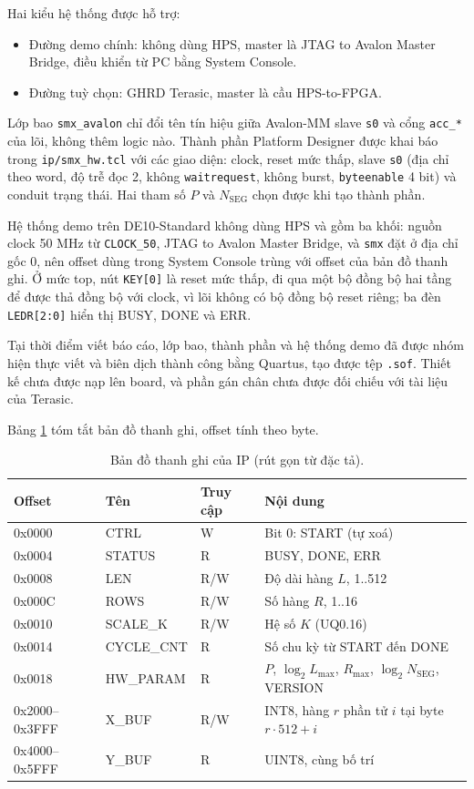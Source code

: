 Hai kiểu hệ thống được hỗ trợ:
\begin{itemize}
  \item Đường demo chính: không dùng HPS, master là JTAG to Avalon Master Bridge, điều khiển từ PC bằng System Console.
  \item Đường tuỳ chọn: GHRD Terasic, master là cầu HPS-to-FPGA.
\end{itemize}

Lớp bao \texttt{smx\_avalon} chỉ đổi tên tín hiệu giữa Avalon-MM slave \texttt{s0} và cổng \texttt{acc\_*} của lõi, không thêm logic nào. Thành phần Platform Designer được khai báo trong \texttt{ip/smx\_hw.tcl} với các giao diện: clock, reset mức thấp, slave \texttt{s0} (địa chỉ theo word, độ trễ đọc 2, không \texttt{waitrequest}, không burst, \texttt{byteenable} 4 bit) và conduit trạng thái. Hai tham số $P$ và $N_{\text{SEG}}$ chọn được khi tạo thành phần.

Hệ thống demo trên DE10-Standard không dùng HPS và gồm ba khối: nguồn clock 50 MHz từ \texttt{CLOCK\_50}, JTAG to Avalon Master Bridge, và \texttt{smx} đặt ở địa chỉ gốc 0, nên offset dùng trong System Console trùng với offset của bản đồ thanh ghi. Ở mức top, nút \texttt{KEY[0]} là reset mức thấp, đi qua một bộ đồng bộ hai tầng để được thả đồng bộ với clock, vì lõi không có bộ đồng bộ reset riêng; ba đèn \texttt{LEDR[2:0]} hiển thị BUSY, DONE và ERR.

Tại thời điểm viết báo cáo, lớp bao, thành phần và hệ thống demo đã được nhóm hiện thực viết và biên dịch thành công bằng Quartus, tạo được tệp \texttt{.sof}. Thiết kế chưa được nạp lên board, và phần gán chân chưa được đối chiếu với tài liệu của Terasic.

Bảng \ref{tab:regmap} tóm tắt bản đồ thanh ghi, offset tính theo byte.

\begin{table}[htbp]
\centering
\small
\begin{tabular}{lllp{7.2cm}}
\toprule
Offset & Tên & Truy cập & Nội dung \\
\midrule
0x0000 & CTRL      & W   & Bit 0: START (tự xoá) \\
0x0004 & STATUS    & R   & BUSY, DONE, ERR \\
0x0008 & LEN       & R/W & Độ dài hàng $L$, 1..512 \\
0x000C & ROWS      & R/W & Số hàng $R$, 1..16 \\
0x0010 & SCALE\_K  & R/W & Hệ số $K$ (UQ0.16) \\
0x0014 & CYCLE\_CNT & R  & Số chu kỳ từ START đến DONE \\
0x0018 & HW\_PARAM & R   & $P$, $\log_2 L_{\max}$, $R_{\max}$, $\log_2 N_{\text{SEG}}$, VERSION \\
0x2000--0x3FFF & X\_BUF & R/W & INT8, hàng $r$ phần tử $i$ tại byte $r \cdot 512 + i$ \\
0x4000--0x5FFF & Y\_BUF & R   & UINT8, cùng bố trí \\
\bottomrule
\end{tabular}
\caption{Bản đồ thanh ghi của IP (rút gọn từ đặc tả).}
\label{tab:regmap}
\end{table}

